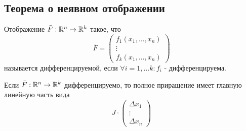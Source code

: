 \subsection{Теорема о неявном отображении}
\begin{definition}
    Отображение $\bar{F}:\mathbb{R}^n\to \mathbb{R}^k$ такое, что
    \[\bar{F}=\begin{pmatrix}
        f_1(x_1,\dots,x_n)\\
        \vdots\\
        f_k(x_1,\dots,x_n)
    \end{pmatrix}
    \]
    называется дифференцируемой, если $\forall i=1,\dots k: f_i$ - дифференцируема. 
\end{definition} 
\begin{statement}
    Если $\bar{F}: \mathbb{R}^n\to \mathbb{R}^k$ дифференцируемо, то полное приращение имеет главную линейную часть вида
    \[J\cdot \begin{pmatrix}
        \Delta x_1\\
        \vdots\\
        \Delta x_n
    \end{pmatrix}\]
\end{statement} 

